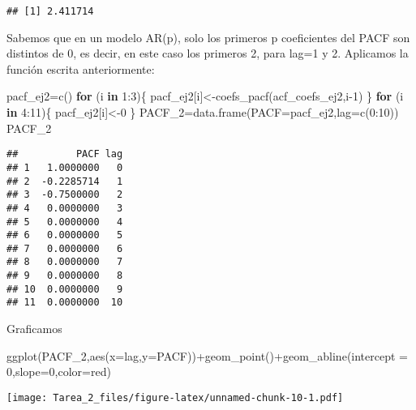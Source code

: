 \documentclass[
]{article}
\newenvironment{Shaded}{\begin{snugshade}}{\end{snugshade}}
\newcommand{\AttributeTok}[1]{\textcolor[rgb]{0.77,0.63,0.00}{#1}}
\newcommand{\ControlFlowTok}[1]{\textcolor[rgb]{0.13,0.29,0.53}{\textbf{#1}}}
\newcommand{\DecValTok}[1]{\textcolor[rgb]{0.00,0.00,0.81}{#1}}
\newcommand{\FunctionTok}[1]{\textcolor[rgb]{0.00,0.00,0.00}{#1}}
\newcommand{\NormalTok}[1]{#1}
\newcommand{\OtherTok}[1]{\textcolor[rgb]{0.56,0.35,0.01}{#1}}
\newcommand{\SpecialCharTok}[1]{\textcolor[rgb]{0.00,0.00,0.00}{#1}}
\newcommand{\StringTok}[1]{\textcolor[rgb]{0.31,0.60,0.02}{#1}}
\begin{document}
\begin{verbatim}
## [1] 2.411714
\end{verbatim}

Sabemos que en un modelo AR(p), solo los primeros p coeficientes del
PACF son distintos de 0, es decir, en este caso los primeros 2, para
lag=1 y 2. Aplicamos la función escrita anteriormente:

\begin{Shaded}
\begin{Highlighting}[]
\NormalTok{pacf\_ej2}\OtherTok{=}\FunctionTok{c}\NormalTok{()}
\ControlFlowTok{for}\NormalTok{ (i }\ControlFlowTok{in} \DecValTok{1}\SpecialCharTok{:}\DecValTok{3}\NormalTok{)\{}
\NormalTok{  pacf\_ej2[i]}\OtherTok{\textless{}{-}}\FunctionTok{coefs\_pacf}\NormalTok{(acf\_coefs\_ej2,i}\DecValTok{{-}1}\NormalTok{)}
\NormalTok{\}}
\ControlFlowTok{for}\NormalTok{ (i }\ControlFlowTok{in} \DecValTok{4}\SpecialCharTok{:}\DecValTok{11}\NormalTok{)\{}
\NormalTok{  pacf\_ej2[i]}\OtherTok{\textless{}{-}}\DecValTok{0}
\NormalTok{\}}
\NormalTok{PACF\_2}\OtherTok{=}\FunctionTok{data.frame}\NormalTok{(}\AttributeTok{PACF=}\NormalTok{pacf\_ej2,}\AttributeTok{lag=}\FunctionTok{c}\NormalTok{(}\DecValTok{0}\SpecialCharTok{:}\DecValTok{10}\NormalTok{))}
\NormalTok{PACF\_2}
\end{Highlighting}
\end{Shaded}

\begin{verbatim}
##          PACF lag
## 1   1.0000000   0
## 2  -0.2285714   1
## 3  -0.7500000   2
## 4   0.0000000   3
## 5   0.0000000   4
## 6   0.0000000   5
## 7   0.0000000   6
## 8   0.0000000   7
## 9   0.0000000   8
## 10  0.0000000   9
## 11  0.0000000  10
\end{verbatim}

Graficamos

\begin{Shaded}
\begin{Highlighting}[]
\FunctionTok{ggplot}\NormalTok{(PACF\_2,}\FunctionTok{aes}\NormalTok{(}\AttributeTok{x=}\NormalTok{lag,}\AttributeTok{y=}\NormalTok{PACF))}\SpecialCharTok{+}\FunctionTok{geom\_point}\NormalTok{()}\SpecialCharTok{+}\FunctionTok{geom\_abline}\NormalTok{(}\AttributeTok{intercept =} \DecValTok{0}\NormalTok{,}\AttributeTok{slope=}\DecValTok{0}\NormalTok{,}\AttributeTok{color=}\StringTok{\textquotesingle{}red\textquotesingle{}}\NormalTok{)}
\end{Highlighting}
\end{Shaded}

\texttt{[image: Tarea\_2\_files/figure-latex/unnamed-chunk-10-1.pdf]}
\end{document}
